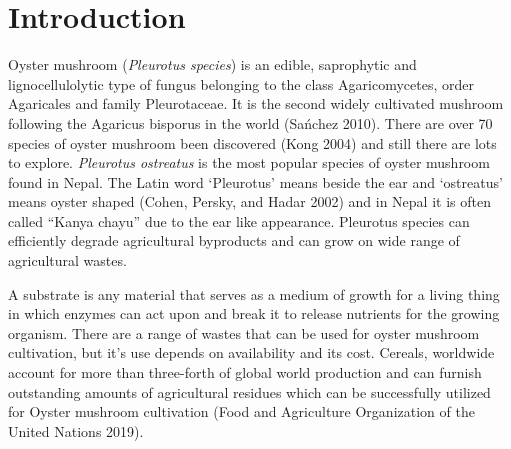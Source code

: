 \documentclass[]{article}
\DeclareRobustCommand{\firstsecond}[2]{#2}
\begin{document}
\hypertarget{introduction}{%
\section{Introduction}\label{introduction}}

Oyster mushroom (\textit{Pleurotus species}) is an edible, saprophytic and lignocellulolytic type of fungus belonging to the class Agaricomycetes, order Agaricales and family Pleurotaceae. It is the second widely cultivated mushroom following the Agaricus bisporus in the world (Sańchez 2010). There are over 70 species of oyster mushroom been discovered (Kong 2004) and still there are lots to explore. \textit{Pleurotus ostreatus} is the most popular species of oyster mushroom found in Nepal. The Latin word `Pleurotus' means beside the ear and `ostreatus' means oyster shaped (Cohen, Persky, and Hadar 2002) and in Nepal it is often called ``Kanya chayu'' due to the ear like appearance. Pleurotus species can efficiently degrade agricultural byproducts and can grow on wide range of agricultural wastes.

A substrate is any material that serves as a medium of growth for a living thing in which enzymes can act upon and break it to release nutrients for the growing organism. There are a range of wastes that can be used for oyster mushroom cultivation, but it's use depends on availability and its cost.
Cereals, worldwide account for more than three-forth of global world production and can furnish outstanding amounts of agricultural residues which can be successfully utilized for Oyster mushroom cultivation (\firstsecond{FAO}{Food and Agriculture Organization of the United Nations} 2019).
\end{document}
